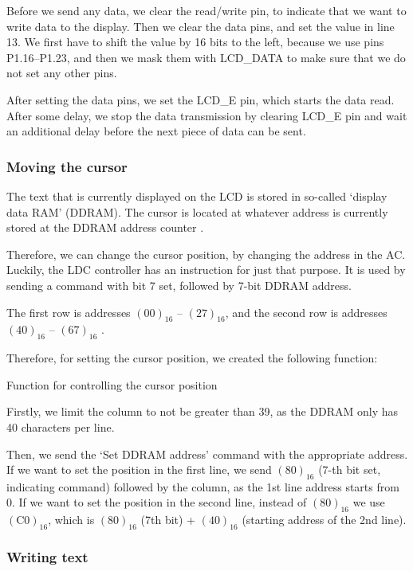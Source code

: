 \documentclass[10pt]{article}
\newcommand{\code}[3]{}
\begin{document}
    Before we send any data, we clear the read/write pin, to indicate that we want to write data to the display.
    Then we clear the data pins, and set the value in line 13.
    We first have to shift the value by 16 bits to the left, because we use pins P1.16--P1.23, and then we mask them with LCD\_DATA to make sure that we do not set any other pins.

    \pagebreak
    After setting the data pins, we set the LCD\_E pin, which starts the data read. 
    After some delay, we stop the data transmission by clearing LCD\_E pin and wait an additional delay before the next piece of data can be sent.

    \subsubsection{Moving the cursor}
    The text that is currently displayed on the LCD is stored in so-called `display data RAM' (DDRAM). 
    The cursor is located at whatever address is currently stored at the DDRAM address counter \cite[p.21]{display-man}.

    Therefore, we can change the cursor position, by changing the address in the AC.
    Luckily, the LDC controller has an instruction for just that purpose.
    It is used by sending a command with bit 7 set, followed by 7-bit DDRAM address.

    The first row is addresses $(00)_{16}$ -- $(27)_{16}$, and the second row is addresses $(40)_{16}$ -- $(67)_{16}$ \cite[p.11]{display-man}.

    Therefore, for setting the cursor position, we created the following function:
    \begin{program}[H]
        \code{108}{116}{display.h}
        \caption{Function for controlling the cursor position}
    \end{program}

    Firstly, we limit the column to not be greater than 39, as the DDRAM only has 40 characters per line.

    Then, we send the `Set DDRAM address' command with the appropriate address.
    If we want to set the position in the first line, we send $(80)_{16}$ (7-th bit set, indicating command) followed by the column, as the 1st line address starts from 0.
    If we want to set the position in the second line, instead of $(80)_{16}$ we use $(\mathrm{C0})_{16}$, which is $(80)_{16}$ (7th bit) + $(40)_{16}$ (starting address of the 2nd line).

    \subsubsection{Writing text}
\end{document}
